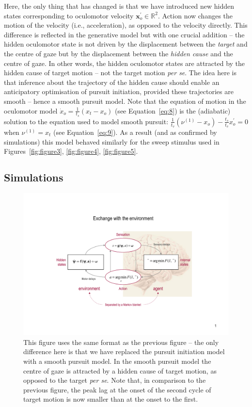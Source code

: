 \documentclass[a4paper]{article} %
\begin{document}
Here, the only thing that has changed is that we have introduced new
hidden states corresponding to oculomotor velocity
$\bm{x}^{\prime}_o \in \mathbb{R}^2$.
Action now changes the motion of the velocity (i.e., acceleration), as
opposed to the velocity directly. This difference is reflected in the
generative model but with one crucial addition -- the hidden oculomotor
state is not driven by the displacement between the \emph{target} and
the centre of gaze but by the displacement between the \emph{hidden
cause} and the centre of gaze. In other words, the hidden oculomotor
states are attracted by the hidden cause of target motion -- not the
target motion \emph{per se}. The idea here is that inference about the
trajectory of the hidden cause should enable an anticipatory
optimisation of pursuit initiation, provided these trajectories are
smooth -- hence a smooth pursuit model. Note that the equation of motion
in the oculomotor model
$\dot{x}_o = \frac{1}{t_s}(x_t-x_o)$
(see Equation~\ref{eq:8}) is the (adiabatic) solution to the equation used to
model smooth pursuit:
$\frac{1}{t_v}(\nu^{(1)}-x_o) - \frac{t_s}{t_v}{x}^{\prime}_o =0 $ when
$\nu^{(1)} =  x_t$ (see
Equation~\ref{eq:9}). As a result (and as confirmed by simulations) this model
behaved similarly for the sweep stimulus used in Figures~\ref{fig:figure3}, \ref{fig:figure4}, \ref{fig:figure5}. %

\subsection{Simulations}

\begin{figure}%
 \centerline{%
 \includegraphics[width=.8\columnwidth, clip, trim = 6cm .5cm 6cm .4cm, page=7]{Figures_slides.pdf} %
}%
\caption{This figure uses the same format as the previous
figure -- the only difference here is that we have replaced the pursuit
initiation model with a smooth pursuit model. In the smooth pursuit
model the centre of gaze is attracted by a hidden cause of target
motion, as opposed to the target \emph{per se}. Note that, in comparison
to the previous figure, the peak lag at the onset of the second cycle of
target motion is now smaller than at the onset to the first.}%
\label{fig:figure7}
\end{figure}
\end{document}
